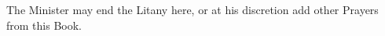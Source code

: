 \begin{rubric}
	The Minister may end the Litany here, or at his discretion add other Prayers from this Book.
\end{rubric}

